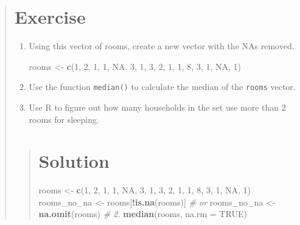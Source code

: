 \documentclass[]{book}
\newenvironment{Shaded}{\begin{snugshade}}{\end{snugshade}}
\newcommand{\KeywordTok}[1]{\textcolor[rgb]{0.13,0.29,0.53}{\textbf{#1}}}
\newcommand{\DataTypeTok}[1]{\textcolor[rgb]{0.13,0.29,0.53}{#1}}
\newcommand{\DecValTok}[1]{\textcolor[rgb]{0.00,0.00,0.81}{#1}}
\newcommand{\StringTok}[1]{\textcolor[rgb]{0.31,0.60,0.02}{#1}}
\newcommand{\CommentTok}[1]{\textcolor[rgb]{0.56,0.35,0.01}{\textit{#1}}}
\newcommand{\OtherTok}[1]{\textcolor[rgb]{0.56,0.35,0.01}{#1}}
\newcommand{\OperatorTok}[1]{\textcolor[rgb]{0.81,0.36,0.00}{\textbf{#1}}}
\newcommand{\NormalTok}[1]{#1}
\begin{document}
\begin{quote}
\section{Exercise}\label{exercise-5}

\begin{enumerate}
\def\labelenumi{\arabic{enumi}.}
\item
  Using this vector of rooms, create a new vector with the NAs removed.

\begin{Shaded}
\begin{Highlighting}[]
\NormalTok{rooms <-}\StringTok{ }\KeywordTok{c}\NormalTok{(}\DecValTok{1}\NormalTok{, }\DecValTok{2}\NormalTok{, }\DecValTok{1}\NormalTok{, }\DecValTok{1}\NormalTok{, }\OtherTok{NA}\NormalTok{, }\DecValTok{3}\NormalTok{, }\DecValTok{1}\NormalTok{, }\DecValTok{3}\NormalTok{, }\DecValTok{2}\NormalTok{, }\DecValTok{1}\NormalTok{, }\DecValTok{1}\NormalTok{, }\DecValTok{8}\NormalTok{, }\DecValTok{3}\NormalTok{, }\DecValTok{1}\NormalTok{, }\OtherTok{NA}\NormalTok{, }\DecValTok{1}\NormalTok{)}
\end{Highlighting}
\end{Shaded}
\item
  Use the function \texttt{median()} to calculate the median of the
  \texttt{rooms} vector.
\item
  Use R to figure out how many households in the set use more than 2
  rooms for sleeping.
\end{enumerate}

\begin{quote}
\section{Solution}\label{solution-4}

\begin{Shaded}
\begin{Highlighting}[]
\NormalTok{rooms <-}\StringTok{ }\KeywordTok{c}\NormalTok{(}\DecValTok{1}\NormalTok{, }\DecValTok{2}\NormalTok{, }\DecValTok{1}\NormalTok{, }\DecValTok{1}\NormalTok{, }\OtherTok{NA}\NormalTok{, }\DecValTok{3}\NormalTok{, }\DecValTok{1}\NormalTok{, }\DecValTok{3}\NormalTok{, }\DecValTok{2}\NormalTok{, }\DecValTok{1}\NormalTok{, }\DecValTok{1}\NormalTok{, }\DecValTok{8}\NormalTok{, }\DecValTok{3}\NormalTok{, }\DecValTok{1}\NormalTok{, }\OtherTok{NA}\NormalTok{, }\DecValTok{1}\NormalTok{)}
\NormalTok{rooms_no_na <-}\StringTok{ }\NormalTok{rooms[}\OperatorTok{!}\KeywordTok{is.na}\NormalTok{(rooms)]}
\CommentTok{# or}
\NormalTok{rooms_no_na <-}\StringTok{ }\KeywordTok{na.omit}\NormalTok{(rooms)}
\CommentTok{# 2.}
\KeywordTok{median}\NormalTok{(rooms, }\DataTypeTok{na.rm =} \OtherTok{TRUE}\NormalTok{)}
\end{Highlighting}
\end{Shaded}


\end{quote}
\end{quote}
\end{document}
